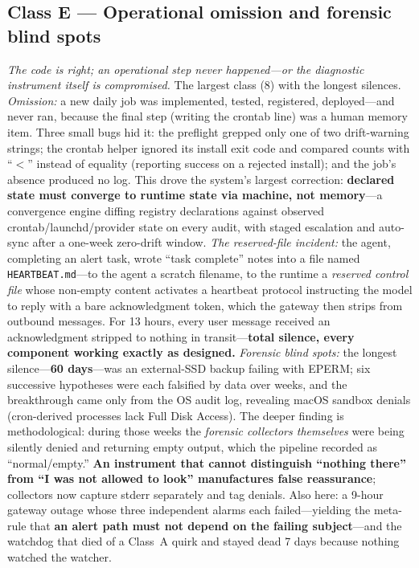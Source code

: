 \documentclass[conference]{IEEEtran}
\begin{document}
\subsection{Class E --- Operational omission and forensic blind spots}
\emph{The code is right; an operational step never happened---or the
diagnostic instrument itself is compromised.} The largest class (8) with
the longest silences. \emph{Omission:} a new daily job was implemented,
tested, registered, deployed---and never ran, because the final step
(writing the crontab line) was a human memory item. Three small bugs hid
it: the preflight grepped only one of two drift-warning strings; the
crontab helper ignored its install exit code and compared counts with
``$<$'' instead of equality (reporting success on a rejected install); and
the job's absence produced no log. This drove the system's largest
correction: \textbf{declared state must converge to runtime state via
machine, not memory}---a convergence engine diffing registry declarations
against observed crontab/launchd/provider state on every audit, with
staged escalation and auto-sync after a one-week zero-drift window.
\emph{The reserved-file incident:} the agent, completing an alert task,
wrote ``task complete'' notes into a file named \texttt{HEARTBEAT.md}---to
the agent a scratch filename, to the runtime a \emph{reserved control
file} whose non-empty content activates a heartbeat protocol instructing
the model to reply with a bare acknowledgment token, which the gateway
then strips from outbound messages. For 13 hours, every user message
received an acknowledgment stripped to nothing in transit---\textbf{total
silence, every component working exactly as designed.} \emph{Forensic
blind spots:} the longest silence---\textbf{60 days}---was an external-SSD
backup failing with EPERM; six successive hypotheses were each falsified
by data over weeks, and the breakthrough came only from the OS audit log,
revealing macOS sandbox denials (cron-derived processes lack Full Disk
Access). The deeper finding is methodological: during those weeks the
\emph{forensic collectors themselves} were being silently denied and
returning empty output, which the pipeline recorded as ``normal/empty.''
\textbf{An instrument that cannot distinguish ``nothing there'' from ``I
was not allowed to look'' manufactures false reassurance}; collectors now
capture stderr separately and tag denials. Also here: a 9-hour gateway
outage whose three independent alarms each failed---yielding the meta-rule
that \textbf{an alert path must not depend on the failing subject}---and
the watchdog that died of a Class~A quirk and stayed dead 7 days because
nothing watched the watcher.
\end{document}
